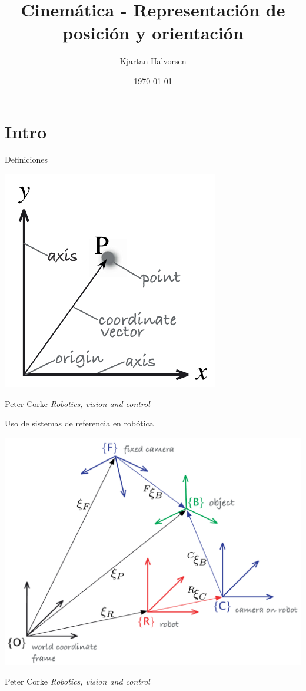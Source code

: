 \documentclass[presentation,aspectratio=169]{beamer}
\author{Kjartan Halvorsen}
\date{\today}
\title{Cinemática - Representación de posición y orientación}
\begin{document}
\maketitle

\section{Intro}
\label{sec:orgca1bf68}
\begin{frame}[label={sec:org38d0c47}]{Definiciones}
\begin{center}
\includegraphics[height=0.5\textheight]{../figures/Corke-fig2.1.a.png}

\footnotesize Peter Corke \emph{Robotics, vision and control}
\end{center}
\end{frame}


\begin{frame}[label={sec:org75d75d6}]{Uso de sistemas de referencia en robótica}
\begin{center}
\includegraphics[height=0.5\textheight]{../figures/Corke-fig2.4.png}

\footnotesize Peter Corke \emph{Robotics, vision and control}
\end{center}
\end{frame}
\end{document}
